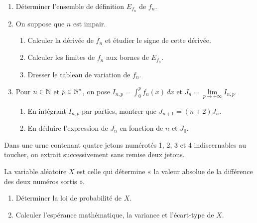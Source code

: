 \documentclass[11pt]{article}
\begin{document}
\begin{enumerate}
  \item Déterminer l'ensemble de définition $E_{f_n}$ de $f_n$.
  \item On suppose que $n$ est impair.
  \begin{enumerate}[label=\alph*.]
    \item Calculer la dérivée de $f_n$ et étudier le signe de cette dérivée.
    \item Calculer les limites de $f_n$ aux bornes de $E_{f_n}$.
    \item Dresser le tableau de variation de $f_n$.
  \end{enumerate}
  \item Pour $n \in \mathbb{N}$ et $p \in \mathbb{N}^*$, on pose $I_{n,p} = \displaystyle\int_0^p f_n(x)\,dx$ et $J_n = \lim\limits_{p\to+\infty} I_{n,p}$.
  \begin{enumerate}[label=\alph*.]
    \item En intégrant $I_{n,p}$ par parties, montrer que $J_{n+1} = (n+2)J_n$.
    \item En déduire l'expression de $J_n$ en fonction de $n$ et $J_0$.
  \end{enumerate}
\end{enumerate}


Dans une urne contenant quatre jetons numérotés 1, 2, 3 et 4 indiscernables au toucher, on extrait successivement sans remise deux jetons.

La variable aléatoire $X$ est celle qui détermine « la valeur absolue de la différence des deux numéros sortis ».

\begin{enumerate}
  \item Déterminer la loi de probabilité de $X$.
  \item Calculer l'espérance mathématique, la variance et l'écart-type de $X$.
\end{enumerate}
\end{document}
